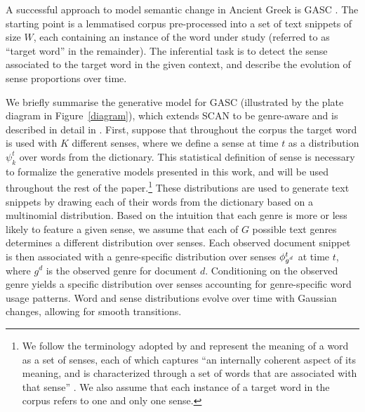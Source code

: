 \documentclass[output=paper%
]{langscibook}
\begin{document}
A successful approach to model semantic change in Ancient Greek is GASC \citep{perrone-etal-2019-gasc}. The starting point is a lemmatised corpus pre-processed into a set of text snippets of size $W$, each containing an instance of the word under study (referred to as ``target word'' in the remainder). 
The inferential task is to detect the sense associated to the target word in the given context, and describe the evolution of sense proportions over time.


We briefly summarise the generative model for GASC (illustrated by the plate diagram in Figure~\ref{diagram}), which extends SCAN \citep{frermann-lapata-2016-bayesian} to be genre-aware and is described in detail in \citet{perrone-etal-2019-gasc}. First, suppose that throughout the corpus the target word is used with $K$ different senses, where we define a sense at time $t$ as a distribution $\psi^t_k$ over words from the dictionary. This statistical definition of sense is necessary to formalize the generative models presented in this work, and will be used throughout the rest of the paper.\footnote{We follow the terminology adopted by \citet{frermann} and represent the meaning of a word as a set of senses, each of which captures ``an internally coherent aspect of its meaning, and is characterized through a set of words that are associated with that sense'' \citep[173]{frermann}. We also assume that each instance of a target word in the corpus refers to one and only one sense.}
These distributions are used to generate text snippets by drawing each of their words from the dictionary based on a multinomial distribution. Based on the intuition that each genre is more or less likely to feature a given sense, we assume that each of $G$ possible text genres determines a different distribution over senses. Each observed document snippet is then associated with a genre-specific distribution over senses $\phi^t_{\smash{g{^d}}}$ at time $t$, where $g{^d}$ is the observed genre for document $d$. Conditioning on the observed genre yields a specific distribution over senses accounting for genre-specific word usage patterns. 
Word and sense distributions evolve over time with Gaussian changes, allowing for smooth transitions. 
\end{document}
